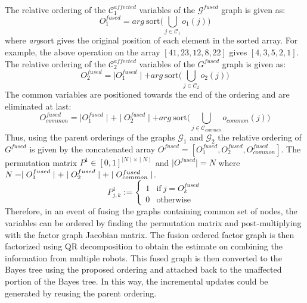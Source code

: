 \paragraph{}
The relative ordering of the $\mathcal{C}_1^{affected}$ variables of the $\mathcal{G}^{fused}$  graph is given as:
\begin{equation}
O^{fused}_1 = arg \ \text{sort}\biggl( \bigcup_{j \in \mathcal{C}_1} o_1(j) \biggr)
\end{equation}
where \textit{arg}sort gives the original position of each element in the sorted array. For example, the above operation on the array $[41, 23, 12, 8, 22]$ gives $[4, 3, 5, 2, 1]$. The relative ordering of the $\mathcal{C}_2^{affected}$ variables of the $G^{fused}$  graph is given as:
\begin{equation}
O^{fused}_2 = \mid O_1^{fused} \mid + arg \ \text{sort}\biggl( \bigcup_{j \in \mathcal{C}_2} o_2(j) \biggr)
\end{equation}
The common variables are positioned towards the end of the ordering and are eliminated at last:
\begin{equation}
O^{fused}_{common} = \mid O_1^{fused} \mid + \mid O_2^{fused} \mid + arg \ \text{sort}\biggl( \bigcup_{j \in \mathcal{C}_{common}} o_{common}(j) \biggr)
\label{eq:fused_ordering}
\end{equation}
Thus, using the parent orderings of the graphs $\mathcal{G}_1$ and $\mathcal{G}_2$ the relative ordering of $G^{fused}$ is given by the concatenated array $O^{fused}  = [ O_1^{fused}, O_2^{fused}, O_{common}^{fused}]$. The permutation matrix $P^1 \in [0,1]^{\mid N \mid \times \mid N \mid}$ and $\mid O^{fused} \mid = N$ where $N = \mid O_1^{fused} \mid + \mid O_2^{fused} \mid + \\ \mid O_{common}^{fused} \mid$. 
\begin{equation}
{\displaystyle P_{j,k}^1:={\begin{cases}1 &{\mbox{if}}\ j=O^{fused}_k \\0&{\mbox{otherwise}}\end{cases}}} 
\label{eq:permutation_matrix}
\end{equation}
Therefore, in an event of fusing the graphs containing common set of nodes, the variables can be ordered by finding the permutation matrix and post-multiplying with the factor graph Jacobian matrix. The fusion ordered factor graph is then factorized using QR decomposition to obtain the estimate on combining the information from multiple robots. This fused graph is then converted to the Bayes tree using the proposed ordering and attached back to the unaffected portion of the Bayes tree. In this way, the incremental updates could be generated by reusing the parent ordering.
